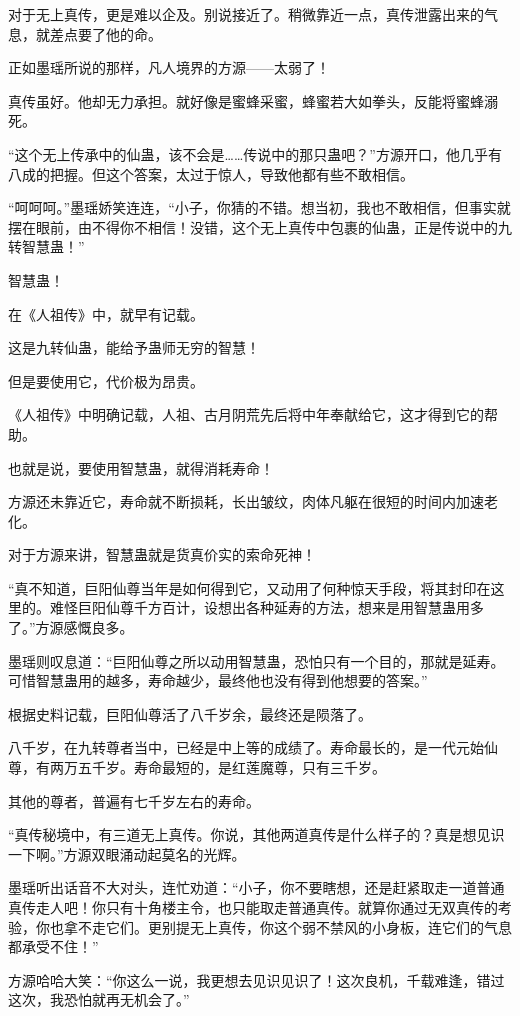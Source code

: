 \begin{this_body}
对于无上真传，更是难以企及。别说接近了。稍微靠近一点，真传泄露出来的气息，就差点要了他的命。

正如墨瑶所说的那样，凡人境界的方源——太弱了！

真传虽好。他却无力承担。就好像是蜜蜂采蜜，蜂蜜若大如拳头，反能将蜜蜂溺死。

“这个无上传承中的仙蛊，该不会是……传说中的那只蛊吧？”方源开口，他几乎有八成的把握。但这个答案，太过于惊人，导致他都有些不敢相信。

“呵呵呵。”墨瑶娇笑连连，“小子，你猜的不错。想当初，我也不敢相信，但事实就摆在眼前，由不得你不相信！没错，这个无上真传中包裹的仙蛊，正是传说中的九转智慧蛊！”

智慧蛊！

在《人祖传》中，就早有记载。

这是九转仙蛊，能给予蛊师无穷的智慧！

但是要使用它，代价极为昂贵。

《人祖传》中明确记载，人祖、古月阴荒先后将中年奉献给它，这才得到它的帮助。

也就是说，要使用智慧蛊，就得消耗寿命！

方源还未靠近它，寿命就不断损耗，长出皱纹，肉体凡躯在很短的时间内加速老化。

对于方源来讲，智慧蛊就是货真价实的索命死神！

“真不知道，巨阳仙尊当年是如何得到它，又动用了何种惊天手段，将其封印在这里的。难怪巨阳仙尊千方百计，设想出各种延寿的方法，想来是用智慧蛊用多了。”方源感慨良多。

墨瑶则叹息道：“巨阳仙尊之所以动用智慧蛊，恐怕只有一个目的，那就是延寿。可惜智慧蛊用的越多，寿命越少，最终他也没有得到他想要的答案。”

根据史料记载，巨阳仙尊活了八千岁余，最终还是陨落了。

八千岁，在九转尊者当中，已经是中上等的成绩了。寿命最长的，是一代元始仙尊，有两万五千岁。寿命最短的，是红莲魔尊，只有三千岁。

其他的尊者，普遍有七千岁左右的寿命。

“真传秘境中，有三道无上真传。你说，其他两道真传是什么样子的？真是想见识一下啊。”方源双眼涌动起莫名的光辉。

墨瑶听出话音不大对头，连忙劝道：“小子，你不要瞎想，还是赶紧取走一道普通真传走人吧！你只有十角楼主令，也只能取走普通真传。就算你通过无双真传的考验，你也拿不走它们。更别提无上真传，你这个弱不禁风的小身板，连它们的气息都承受不住！”

方源哈哈大笑：“你这么一说，我更想去见识见识了！这次良机，千载难逢，错过这次，我恐怕就再无机会了。”


\end{this_body}
